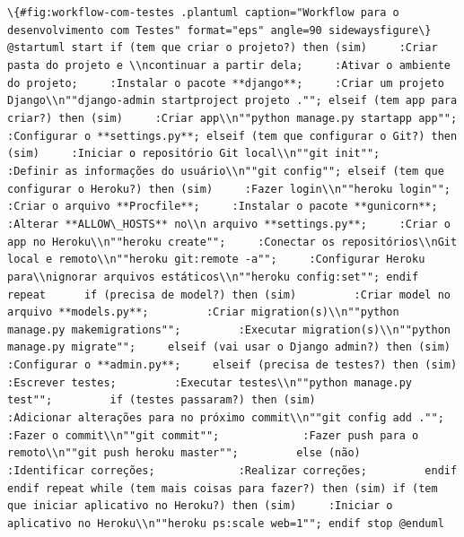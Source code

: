 \documentclass[brazil,a4paper,oneside,openright,parskip=full]{book}
\newcommand{\passthrough}[1]{#1}
\begin{document}
\passthrough{\lstinline!\{#fig:workflow-com-testes .plantuml caption="Workflow para o desenvolvimento com Testes" format="eps" angle=90 sidewaysfigure\} @startuml start if (tem que criar o projeto?) then (sim)     :Criar pasta do projeto e \\ncontinuar a partir dela;     :Ativar o ambiente do projeto;     :Instalar o pacote **django**;     :Criar um projeto Django\\n""django-admin startproject projeto .""; elseif (tem app para criar?) then (sim)     :Criar app\\n""python manage.py startapp app"";     :Configurar o **settings.py**; elseif (tem que configurar o Git?) then (sim)     :Iniciar o repositório Git local\\n""git init"";     :Definir as informações do usuário\\n""git config""; elseif (tem que configurar o Heroku?) then (sim)     :Fazer login\\n""heroku login"";     :Criar o arquivo **Procfile**;     :Instalar o pacote **gunicorn**;     :Alterar **ALLOW\_HOSTS** no\\n arquivo **settings.py**;     :Criar o app no Heroku\\n""heroku create"";     :Conectar os repositórios\\nGit local e remoto\\n""heroku git:remote -a"";     :Configurar Heroku para\\nignorar arquivos estáticos\\n""heroku config:set""; endif repeat      if (precisa de model?) then (sim)         :Criar model no arquivo **models.py**;         :Criar migration(s)\\n""python manage.py makemigrations"";         :Executar migration(s)\\n""python manage.py migrate"";     elseif (vai usar o Django admin?) then (sim)         :Configurar o **admin.py**;     elseif (precisa de testes?) then (sim)         :Escrever testes;         :Executar testes\\n""python manage.py test"";         if (testes passaram?) then (sim)             :Adicionar alterações para no próximo commit\\n""git config add ."";             :Fazer o commit\\n""git commit"";             :Fazer push para o remoto\\n""git push heroku master"";         else (não)             :Identificar correções;             :Realizar correções;         endif     endif repeat while (tem mais coisas para fazer?) then (sim) if (tem que iniciar aplicativo no Heroku?) then (sim)     :Iniciar o aplicativo no Heroku\\n""heroku ps:scale web=1""; endif stop @enduml!}
\end{document}
